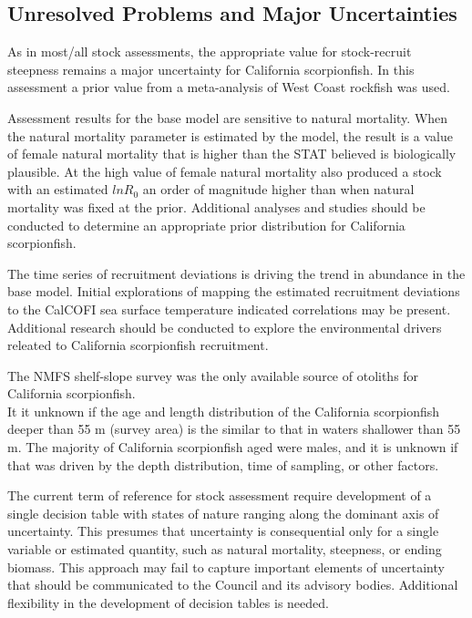 \documentclass[12pt,]{article}
\begin{document}
\subsection*{Unresolved Problems and Major
Uncertainties}\label{unresolved-problems-and-major-uncertainties}

As in most/all stock assessments, the appropriate value for
stock-recruit steepness remains a major uncertainty for California
scorpionfish. In this assessment a prior value from a meta-analysis of
West Coast rockfish was used.

Assessment results for the base model are sensitive to natural
mortality. When the natural mortality parameter is estimated by the
model, the result is a value of female natural mortality that is higher
than the STAT believed is biologically plausible. At the high value of
female natural mortality also produced a stock with an estimated
\(lnR_0\) an order of magnitude higher than when natural mortality was
fixed at the prior. Additional analyses and studies should be conducted
to determine an appropriate prior distribution for California
scorpionfish.

The time series of recruitment deviations is driving the trend in
abundance in the base model. Initial explorations of mapping the
estimated recruitment deviations to the CalCOFI sea surface temperature
indicated correlations may be present. Additional research should be
conducted to explore the environmental drivers releated to California
scorpionfish recruitment.

The NMFS shelf-slope survey was the only available source of otoliths
for California scorpionfish.\\
It it unknown if the age and length distribution of the California
scorpionfish deeper than 55 m (survey area) is the similar to that in
waters shallower than 55 m. The majority of California scorpionfish aged
were males, and it is unknown if that was driven by the depth
distribution, time of sampling, or other factors.

The current term of reference for stock assessment require development
of a single decision table with states of nature ranging along the
dominant axis of uncertainty. This presumes that uncertainty is
consequential only for a single variable or estimated quantity, such as
natural mortality, steepness, or ending biomass. This approach may fail
to capture important elements of uncertainty that should be communicated
to the Council and its advisory bodies. Additional flexibility in the
development of decision tables is needed.
\end{document}
